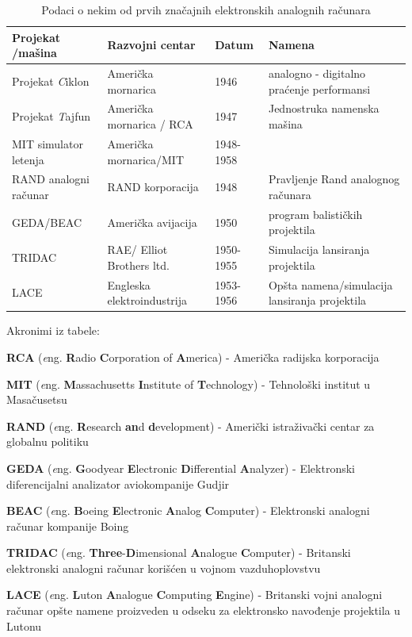 \documentclass[a4paper]{article}
\begin{document}
	\begin{table}[h!]
		\begin{threeparttable}
			\caption{Podaci o nekim od prvih značajnih elektronskih analognih računara}
			\begin{tabular}{| m{2cm} | m{4cm} | m{1cm} | m{4cm} |}
				\hline
				Projekat /mašina & Razvojni centar & Datum & Namena \\
				\hline
				\hline
				Projekat \emph Ciklon & Američka mornarica & 1946 & analogno - digitalno praćenje performansi \\
				\hline
				Projekat \emph Tajfun & Američka mornarica / RCA & 1947 & Jednostruka namenska mašina \\
				\hline
				MIT simulator letenja & Američka mornarica/MIT & 1948- 1958 & \\
				\hline
				RAND analogni računar & RAND korporacija & 1948 & Pravljenje Rand analognog računara \\
				\hline
				GEDA/BEAC &  Američka avijacija & 1950 & program balističkih projektila \\
				\hline
				TRIDAC & RAE/ Elliot Brothers ltd. & 1950- 1955 & Simulacija lansiranja projektila \\
				\hline
				LACE & Engleska elektroindustrija & 1953- 1956 & Opšta namena/simulacija lansiranja projektila \\ 
				\hline
			\end{tabular}
			\label{tab:tableEAR}
			\begin{tablenotes}
				\small
				\item Akronimi iz tabele:
				\item \textbf{RCA} (\textit eng. \textbf Radio \textbf Corporation of \textbf America) - Američka radijska korporacija
				\item \textbf{MIT} (\textit eng. \textbf Massachusetts \textbf Institute of \textbf Technology) - Tehnološki institut u Masačusetsu
				\item \textbf{RAND} (\textit eng. \textbf Research \textbf{an}d \textbf development) - Američki istraživački centar za globalnu politiku
				\item \textbf{GEDA} (\textit eng. \textbf Goodyear \textbf Electronic \textbf Differential \textbf Analyzer) - Elektronski diferencijalni analizator aviokompanije Gudjir
				\item \textbf{BEAC} (\textit eng. \textbf Boeing \textbf Electronic \textbf Analog \textbf Computer) - Elektronski analogni računar kompanije Boing
				\item \textbf{TRIDAC} (\textit eng. \textbf {Three}-\textbf Dimensional \textbf Analogue \textbf Computer) - Britanski elektronski analogni računar korišćen u vojnom vazduhoplovstvu
				\item \textbf{LACE} (\textit eng. \textbf Luton \textbf Analogue \textbf Computing \textbf Engine) - Britanski vojni analogni računar opšte namene proizveden u odseku za elektronsko navođenje projektila u Lutonu 
			\end{tablenotes}
		\end{threeparttable}
	\end{table}
\end{document}
